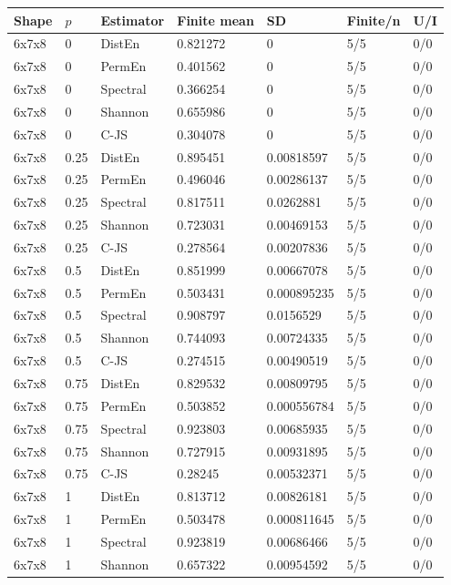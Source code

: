 \documentclass[
  english,
  11pt,
]{article}
\newcounter{none} %
\begin{document}
{\def\LTcaptype{none} %
\begin{longtable}[]{@{}lllllll@{}}
\toprule\noalign{}
Shape & \(p\) & Estimator & Finite mean & SD & Finite/n & U/I \\
\midrule\noalign{}
\endhead
\bottomrule\noalign{}
\endlastfoot
6x7x8 & 0 & DistEn & 0.821272 & 0 & 5/5 & 0/0 \\
6x7x8 & 0 & PermEn & 0.401562 & 0 & 5/5 & 0/0 \\
6x7x8 & 0 & Spectral & 0.366254 & 0 & 5/5 & 0/0 \\
6x7x8 & 0 & Shannon & 0.655986 & 0 & 5/5 & 0/0 \\
6x7x8 & 0 & C-JS & 0.304078 & 0 & 5/5 & 0/0 \\
6x7x8 & 0.25 & DistEn & 0.895451 & 0.00818597 & 5/5 & 0/0 \\
6x7x8 & 0.25 & PermEn & 0.496046 & 0.00286137 & 5/5 & 0/0 \\
6x7x8 & 0.25 & Spectral & 0.817511 & 0.0262881 & 5/5 & 0/0 \\
6x7x8 & 0.25 & Shannon & 0.723031 & 0.00469153 & 5/5 & 0/0 \\
6x7x8 & 0.25 & C-JS & 0.278564 & 0.00207836 & 5/5 & 0/0 \\
6x7x8 & 0.5 & DistEn & 0.851999 & 0.00667078 & 5/5 & 0/0 \\
6x7x8 & 0.5 & PermEn & 0.503431 & 0.000895235 & 5/5 & 0/0 \\
6x7x8 & 0.5 & Spectral & 0.908797 & 0.0156529 & 5/5 & 0/0 \\
6x7x8 & 0.5 & Shannon & 0.744093 & 0.00724335 & 5/5 & 0/0 \\
6x7x8 & 0.5 & C-JS & 0.274515 & 0.00490519 & 5/5 & 0/0 \\
6x7x8 & 0.75 & DistEn & 0.829532 & 0.00809795 & 5/5 & 0/0 \\
6x7x8 & 0.75 & PermEn & 0.503852 & 0.000556784 & 5/5 & 0/0 \\
6x7x8 & 0.75 & Spectral & 0.923803 & 0.00685935 & 5/5 & 0/0 \\
6x7x8 & 0.75 & Shannon & 0.727915 & 0.00931895 & 5/5 & 0/0 \\
6x7x8 & 0.75 & C-JS & 0.28245 & 0.00532371 & 5/5 & 0/0 \\
6x7x8 & 1 & DistEn & 0.813712 & 0.00826181 & 5/5 & 0/0 \\
6x7x8 & 1 & PermEn & 0.503478 & 0.000811645 & 5/5 & 0/0 \\
6x7x8 & 1 & Spectral & 0.923819 & 0.00686466 & 5/5 & 0/0 \\
6x7x8 & 1 & Shannon & 0.657322 & 0.00954592 & 5/5 & 0/0 \\

\end{longtable}}
\end{document}
